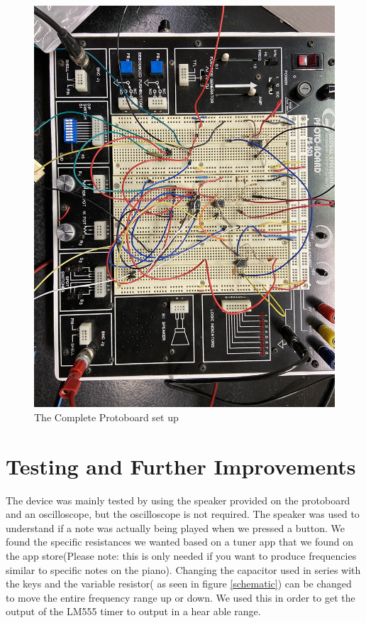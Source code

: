 \documentclass[12pt]{article}
\begin{document}
\begin{figure}[h!]
    \centering
    \includegraphics[scale=0.1]{complete.jpg}
    \caption{The Complete Protoboard set up}
    \label{complete}
\end{figure}{}
\newpage
\section{Testing and Further Improvements}
The device was mainly tested by using the speaker provided on the protoboard and an oscilloscope, but the oscilloscope is not required. The speaker was used to understand if a note was actually being played when we pressed a button. We found the specific resistances we wanted based on a tuner app that we found on the app store(Please note: this is only needed if you want to produce frequencies similar to specific notes on the piano). Changing the capacitor used in series with the keys and the variable resistor( as seen in figure \ref{schematic}) can be changed to move the entire frequency range up or down. We used this in order to get the output of the LM555 timer to output in a hear able range. 
\end{document}
